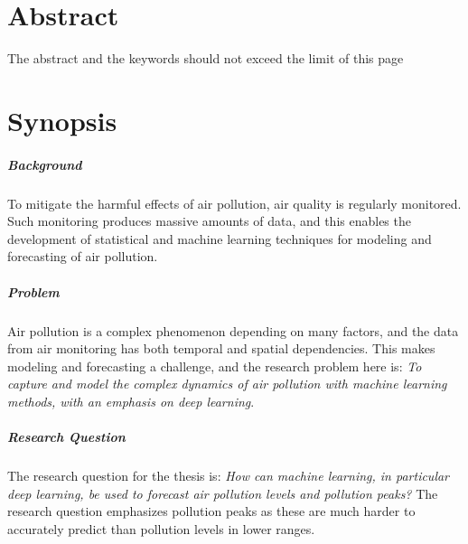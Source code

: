 \documentclass[12pt]{report}
\numberwithin{equation}{section}
\begin{document}



\chapter*{Abstract}
\thispagestyle{empty}
The abstract and the keywords should not exceed the limit of this page

\chapter*{Synopsis}
\thispagestyle{empty}

\paragraph{Background}
To mitigate the harmful effects of air pollution, air quality is regularly monitored. Such monitoring produces massive amounts of data, and this enables the development of statistical and machine learning techniques for modeling and forecasting of air pollution.
\paragraph{Problem}
Air pollution is a complex phenomenon depending on many factors, and the data from air monitoring has both temporal and spatial dependencies. This makes modeling and forecasting a challenge, and the research problem here is: \textit{To capture and model the complex dynamics of air pollution with machine learning methods, with an emphasis on deep learning}.

\paragraph{Research Question}
The research question for the thesis is: \textit{How can machine learning, in particular deep learning, be used to forecast air pollution levels and pollution peaks?} The research question emphasizes pollution peaks as these are much harder to accurately predict than pollution levels in lower ranges.  %
%
\end{document}
